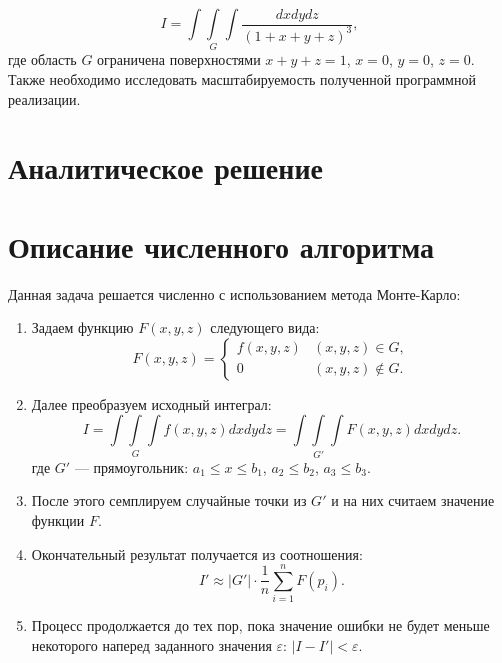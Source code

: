 \documentclass[a4paper, 12pt]{article}
\begin{document}
    \begin{equation}
        I = \int\int\limits_{G}\int \frac{dxdydz}{{(1 + x + y + z)}^3},
    \end{equation}
    где область $G$ ограничена поверхностями $x + y + z = 1$, $x = 0$, $y = 0$, $z = 0$.\\
    
    Также необходимо исследовать масштабируемость полученной программной реализации.

\section{Аналитическое решение}

\section{Описание численного алгоритма}

    Данная задача решается численно с использованием метода Монте-Карло: 
    \begin{enumerate}
        \item Задаем функцию $F(x, y, z)$ следующего вида:
            \begin{equation}
                F\left(x, y, z\right) = \left\{
                    \begin{array}{ll}
                        f\left(x, y, z\right) & \left(x, y, z\right) \in G, \\
                        0 & \left(x, y, z\right) \not\in G.
                    \end{array}
                \right.
            \end{equation}
        \item Далее преобразуем исходный интеграл:
            \begin{equation}
                I = \int\int\limits_{G}\int f\left(x, y, z\right)dxdydz = \int\int\limits_{G'}\int F\left(x, y, z\right) dxdydz.
            \end{equation}
            где $G'$ --- прямоугольник: $a_1 \leq x \leq b_1$, $a_2 \leq b_2$, $a_3 \leq b_3$.
        \item После этого семплируем случайные точки из $G'$ и на них считаем значение функции $F$.
        \item Окончательный результат получается из соотношения:
            \begin{equation}
                I' \approx \rvert G' \rvert \cdot \frac{1}{n} \sum\limits_{i = 1}^n F(p_i).
            \end{equation}
        \item Процесс продолжается до тех пор, пока значение ошибки не будет меньше некоторого наперед заданного значения $\varepsilon$: $|I - I'| < \varepsilon$.
    \end{enumerate}
\end{document}
